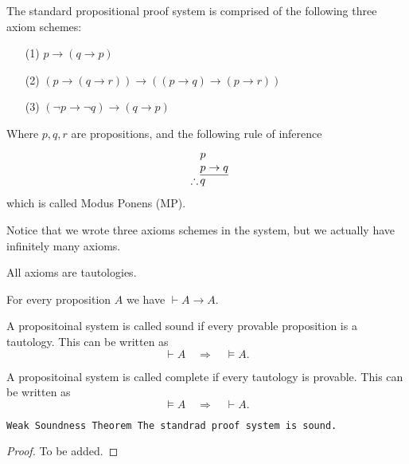 \documentclass[11pt,a4paper]{article}
\renewcommand{\implies}{\rightarrow}
\begin{document}
  \begin{definition}
    The standard propositional proof system is comprised of the
    following three axiom schemes:
    \begin{enumerate}
      \item[(1)] $p\to (q\to p)$
      \item[(2)] $(p\to (q\to r))\to ((p\to q)\to (p\to r))$
      \item[(3)] $(\neg p\to \neg q)\to (q\to p)$
    \end{enumerate}
    Where $p,q,r$ are propositions,
    and the following rule of inference
    \[
      \begin{array}{c@{\,}l@{}}
                  & p         \\
                  & p \to q   \\ \cline{2-2}
      \therefore  & q
      \end{array}
    \]
    which is called Modus Ponens (MP).
  \end{definition}
  \begin{remark}
    Notice that we wrote three axioms schemes in the system, but we
    actually have infinitely many axioms.
  \end{remark}
  \begin{remark}
    All axioms are tautologies.
  \end{remark}

  \begin{proposition}
    For every proposition $A$ we have $\vdash A \implies A$.
  \end{proposition}

  \begin{definition}
    A propositoinal system is called sound if every provable proposition
    is a tautology. This can be written as
    \[
      \vdash A \quad\Rightarrow\quad \models A.
    \]
  \end{definition}

  \begin{definition}
    A propositoinal system is called complete if every tautology is
    provable. This can be written as
    \[
      \models A \quad\Rightarrow\quad \vdash A.
    \]
  \end{definition}

  \begin{theorem}\label{thm:weak-soundness}\tt{Weak Soundness Theorem}
    The standrad proof system is sound.
  \end{theorem}
  \begin{proof}
    To be added.
  \end{proof}
\end{document}
